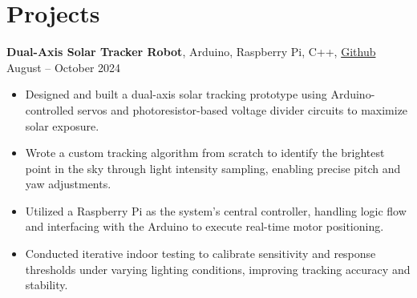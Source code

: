 \documentclass[11pt]{article}
\begin{document}
\vspace{-14pt}
\section*{Projects}
\vspace{5pt}
\textbf{Dual-Axis Solar Tracker Robot}, Arduino, Raspberry Pi, C++, \href{https://github.com/edwardasilva/SolarPanelProject}{Github} \hfill August -- October 2024
\vspace{-5pt}
\begin{itemize}
  \item Designed and built a dual-axis solar tracking prototype using Arduino-controlled servos and photoresistor-based voltage divider circuits to maximize solar exposure.
  \item Wrote a custom tracking algorithm from scratch to identify the brightest point in the sky through light intensity sampling, enabling precise pitch and yaw adjustments.
  \item Utilized a Raspberry Pi as the system's central controller, handling logic flow and interfacing with the Arduino to execute real-time motor positioning.
  \item Conducted iterative indoor testing to calibrate sensitivity and response thresholds under varying lighting conditions, improving tracking accuracy and stability.
\end{itemize}

\vspace{-14pt}
\end{document}
